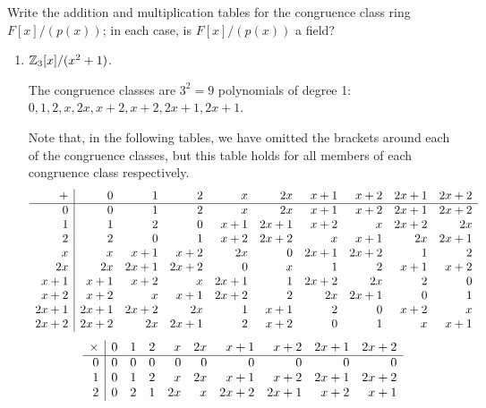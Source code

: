 \documentclass[../hw6]{subfiles}
\begin{document}
\begin{problem}
Write the addition  and multiplication tables for the congruence class ring $F[x]/(p(x))$;
in each case, is $F[x]/(p(x))$ a field?
\end{problem}
\begin{enumerate}[label=\roman*)]
	\item $\mathbb{Z}_3[x]/(x^2+1)$.

	      The congruence classes are $3^2=9$ polynomials of degree 1:
	      $0,1,2,x,2x,x+2,x+2,2x+1,2x+1$.

	      Note that, in the following tables, we have omitted the brackets around each of the congruence classes, but this table holds for all members of each congruence class respectively.
	      \[\begin{array}{r | r r r r r r r r r}
			      +    & 0    & 1    & 2    & x    & 2x   & x+1  & x+2  & 2x+1 & 2x+2 \\
			      \hline
			      0    & 0    & 1    & 2    & x    & 2x   & x+1  & x+2  & 2x+1 & 2x+2 \\
			      1    & 1    & 2    & 0    & x+1  & 2x+1 & x+2  & x    & 2x+2 & 2x   \\
			      2    & 2    & 0    & 1    & x+2  & 2x+2 & x    & x+1  & 2x   & 2x+1 \\
			      x    & x    & x+1  & x+2  & 2x   & 0    & 2x+1 & 2x+2 & 1    & 2    \\
			      2x   & 2x   & 2x+1 & 2x+2 & 0    & x    & 1    & 2    & x+1  & x+2  \\
			      x+1  & x+1  & x+2  & x    & 2x+1 & 1    & 2x+2 & 2x   & 2    & 0    \\
			      x+2  & x+2  & x    & x+1  & 2x+2 & 2    & 2x   & 2x+1 & 0    & 1    \\
			      2x+1 & 2x+1 & 2x+2 & 2x   & 1    & x+1  & 2    & 0    & x+2  & x    \\
			      2x+2 & 2x+2 & 2x   & 2x+1 & 2    & x+2  & 0    & 1    & x    & x+1  \\
		      \end{array}\]
	      \[\begin{array}{r | r r r r r r r r r}
			      \times & 0 & 1    & 2    & x    & 2x   & x+1  & x+2  & 2x+1 & 2x+2 \\
			      \hline
			      0      & 0 & 0    & 0    & 0    & 0    & 0    & 0    & 0    & 0    \\
			      1      & 0 & 1    & 2    & x    & 2x   & x+1  & x+2  & 2x+1 & 2x+2 \\
			      2      & 0 & 2    & 1    & 2x   & x    & 2x+2 & 2x+1 & x+2  & x+1  \\

\end{array}\]
\end{enumerate}
\end{document}
